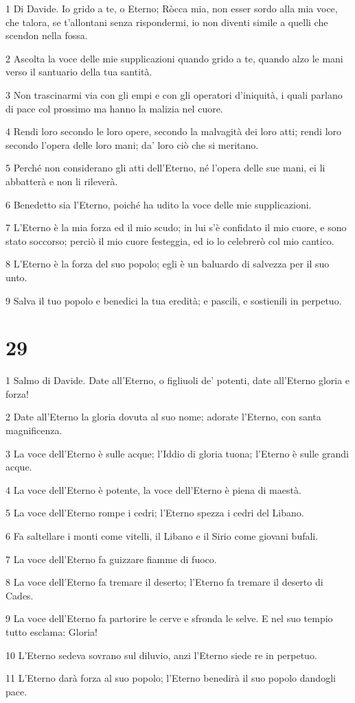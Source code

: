 \par 1 Di Davide. Io grido a te, o Eterno; Ròcca mia, non esser sordo alla mia voce, che talora, se t'allontani senza rispondermi, io non diventi simile a quelli che scendon nella fossa.
\par 2 Ascolta la voce delle mie supplicazioni quando grido a te, quando alzo le mani verso il santuario della tua santità.
\par 3 Non trascinarmi via con gli empi e con gli operatori d'iniquità, i quali parlano di pace col prossimo ma hanno la malizia nel cuore.
\par 4 Rendi loro secondo le loro opere, secondo la malvagità dei loro atti; rendi loro secondo l'opera delle loro mani; da' loro ciò che si meritano.
\par 5 Perché non considerano gli atti dell'Eterno, né l'opera delle sue mani, ei li abbatterà e non li rileverà.
\par 6 Benedetto sia l'Eterno, poiché ha udito la voce delle mie supplicazioni.
\par 7 L'Eterno è la mia forza ed il mio scudo; in lui s'è confidato il mio cuore, e sono stato soccorso; perciò il mio cuore festeggia, ed io lo celebrerò col mio cantico.
\par 8 L'Eterno è la forza del suo popolo; egli è un baluardo di salvezza per il suo unto.
\par 9 Salva il tuo popolo e benedici la tua eredità; e pascili, e sostienili in perpetuo.

\chapter{29}

\par 1 Salmo di Davide. Date all'Eterno, o figliuoli de' potenti, date all'Eterno gloria e forza!
\par 2 Date all'Eterno la gloria dovuta al suo nome; adorate l'Eterno, con santa magnificenza.
\par 3 La voce dell'Eterno è sulle acque; l'Iddio di gloria tuona; l'Eterno è sulle grandi acque.
\par 4 La voce dell'Eterno è potente, la voce dell'Eterno è piena di maestà.
\par 5 La voce dell'Eterno rompe i cedri; l'Eterno spezza i cedri del Libano.
\par 6 Fa saltellare i monti come vitelli, il Libano e il Sirio come giovani bufali.
\par 7 La voce dell'Eterno fa guizzare fiamme di fuoco.
\par 8 La voce dell'Eterno fa tremare il deserto; l'Eterno fa tremare il deserto di Cades.
\par 9 La voce dell'Eterno fa partorire le cerve e sfronda le selve. E nel suo tempio tutto esclama: Gloria!
\par 10 L'Eterno sedeva sovrano sul diluvio, anzi l'Eterno siede re in perpetuo.
\par 11 L'Eterno darà forza al suo popolo; l'Eterno benedirà il suo popolo dandogli pace.

